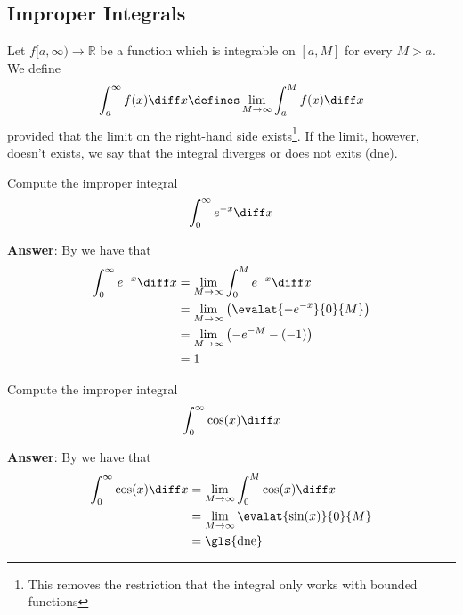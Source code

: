 \subsection{Improper Integrals}\label{subsec-improper-integrals}

\begin{definition}\label{def-improper-integral}
	Let $f[a,\infty)\to\mathbb{R}$ be a function which is integrable on $[a,M]$
	for every $M>a$. We define
	\begin{equation}\label{eq-improper-integral:1}
		\int_a^\infty f(x) \diff x \defines \lim_{M\to\infty} \int_a^M f(x) \diff x
	\end{equation}
	provided that the limit on the right-hand side exists\footnote{This removes the
		restriction that the integral only works with bounded functions}. If the limit,
	however, doesn't exists, we say that the integral diverges or does not exits (\gls{dne}).
\end{definition}

\begin{exm}\label{exm-improper-integral:1}
	Compute the improper integral
	\begin{equation*}
		\int_0^\infty e^{-x} \diff x
	\end{equation*}
	\begin{flushleft}
		\textbf{Answer}: By  we have that
		\begin{align*}
			\int_0^\infty e^{-x} \diff x
			 & = \lim_{M\to\infty} \int_0^M e^{-x} \diff x             \\
			 & = \lim_{M\to\infty} \left(\evalat{-e^{-x}}{0}{M}\right) \\
			 & = \lim_{M\to\infty} \left(-e^{-M}-(-1)\right)           \\
			 & = 1
		\end{align*}
	\end{flushleft}
\end{exm}

\begin{exm}\label{exm-improper-integral:2}
	Compute the improper integral
	\begin{equation*}
		\int_0^\infty \cos(x) \diff x
	\end{equation*}
	\begin{flushleft}
		\textbf{Answer}: By  we have that
		\begin{align*}
			\int_0^\infty \cos(x) \diff x
			 & = \lim_{M\to\infty}\int_0^M \cos(x) \diff x \\
			 & = \lim_{M\to\infty}\evalat{\sin(x)}{0}{M}   \\
			 & = \text{\gls{dne}}
		\end{align*}
	\end{flushleft}
\end{exm}

